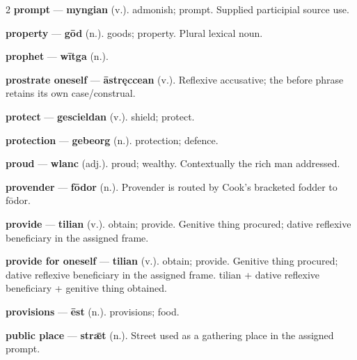\begin{multicols}{2}
\textbf{prompt} — \textbf{myngian} (v.). admonish; prompt. Supplied participial source use.\par
\textbf{property} — \textbf{gōd} (n.). goods; property. Plural lexical noun.\par
\textbf{prophet} — \textbf{wītga} (n.).\par
\textbf{prostrate oneself} — \textbf{āstręccean} (v.). Reflexive accusative; the before phrase retains its own case/construal.\par
\textbf{protect} — \textbf{gescieldan} (v.). shield; protect.\par
\textbf{protection} — \textbf{gebeorg} (n.). protection; defence.\par
\textbf{proud} — \textbf{wlanc} (adj.). proud; wealthy. Contextually the rich man addressed.\par
\textbf{provender} — \textbf{fōdor} (n.). Provender is routed by Cook's bracketed fodder to fōdor.\par
\textbf{provide} — \textbf{tilian} (v.). obtain; provide. Genitive thing procured; dative reflexive beneficiary in the assigned frame.\par
\textbf{provide for oneself} — \textbf{tilian} (v.). obtain; provide. Genitive thing procured; dative reflexive beneficiary in the assigned frame. tilian + dative reflexive beneficiary + genitive thing obtained.\par
\textbf{provisions} — \textbf{ēst} (n.). provisions; food.\par
\textbf{public place} — \textbf{strǣt} (n.). Street used as a gathering place in the assigned prompt.\par

\end{multicols}
